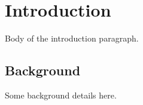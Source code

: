 \documentclass{article}
\begin{document}
\section{Introduction}
Body of the introduction paragraph.
\subsection{Background}
Some background details here.
\end{document}
